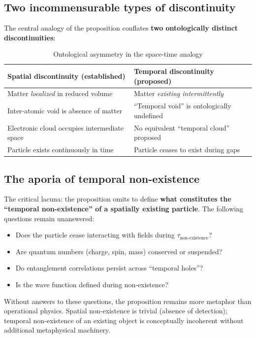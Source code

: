 \documentclass[11pt,a4paper]{article}
\begin{document}
\subsection{Two incommensurable types of discontinuity}

The central analogy of the proposition conflates \textbf{two ontologically distinct discontinuities}:

\begin{table}[h]
\centering
\begin{tabular}{@{}p{}p{}@{}}
\toprule
\textbf{Spatial discontinuity (established)} & \textbf{Temporal discontinuity (proposed)} \\
\midrule
Matter \textit{localized} in reduced volume & Matter \textit{existing intermittently} \\
Inter-atomic void is absence of matter & ``Temporal void'' is ontologically undefined \\
Electronic cloud occupies intermediate space & No equivalent ``temporal cloud'' proposed \\
Particle exists continuously in time & Particle ceases to exist during gaps \\
\bottomrule
\end{tabular}
\caption{Ontological asymmetry in the space-time analogy}
\end{table}

\subsection{The aporia of temporal non-existence}

The critical lacuna: the proposition omits to define \textbf{what constitutes the ``temporal non-existence'' of a spatially existing particle}. The following questions remain unanswered:

\begin{itemize}[leftmargin=*]
    \item Does the particle cease interacting with fields during $\tau_{\text{non-existence}}$?
    \item Are quantum numbers (charge, spin, mass) conserved or suspended?
    \item Do entanglement correlations persist across ``temporal holes''?
    \item Is the wave function defined during non-existence?
\end{itemize}

Without answers to these questions, the proposition remains more metaphor than operational physics. Spatial non-existence is trivial (absence of detection); temporal non-existence of an existing object is conceptually incoherent without additional metaphysical machinery.
\end{document}
